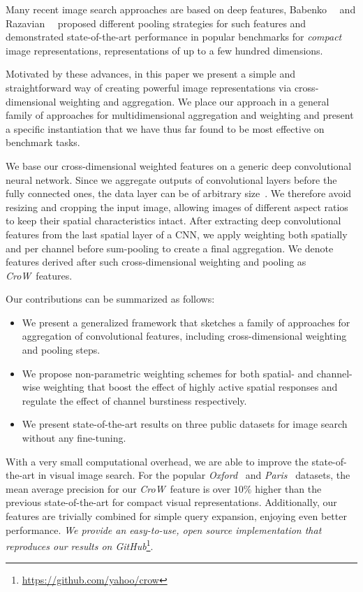 \documentclass[runningheads]{llncs}
\newcommand{\CroW}{\textit{CroW}~} \newcommand{\Crow}{\CroW}
\begin{document}
Many recent image search approaches are based on deep features, \eg Babenko~\etal~\cite{BSCL14,BaLe15} and Razavian~\etal~\cite{RASC14,ARS+14} proposed different pooling strategies for such features and demonstrated state-of-the-art performance in popular benchmarks for \textit{compact} image representations, \ie representations of up to a few hundred dimensions.

Motivated by these advances, in this paper we present a simple and straightforward way of creating powerful image representations via cross-dimensional weighting and aggregation. We place our approach in a general family of approaches for multidimensional aggregation and weighting and present a specific instantiation that we have thus far found to be most effective on benchmark tasks.


We base our cross-dimensional weighted features on a generic deep convolutional neural network. Since we aggregate outputs of convolutional layers before the fully connected ones, the data layer can be of arbitrary size~\cite{LoSD14}. We therefore avoid resizing and cropping the input image, allowing images of different aspect ratios to keep their spatial characteristics intact. After extracting deep convolutional features from the last spatial layer of a CNN, we apply weighting both spatially and per channel before sum-pooling to create a final aggregation. We denote features derived after such cross-dimensional weighting and pooling as \CroW features.



Our contributions can be summarized as follows:
\begin{itemize}
\setlength\itemsep{.01em}
\item We present a generalized framework that sketches a family of approaches for aggregation of convolutional features, including cross-dimensional weighting and pooling steps.
\item We propose non-parametric weighting schemes for both spatial- and channel-wise weighting that boost the effect of highly active spatial responses and regulate the effect of channel burstiness respectively. 
\item We present state-of-the-art results on three public datasets for image search without any fine-tuning. 
\end{itemize}

With a very small computational overhead, we are able to improve the state-of-the-art in visual image search.
For the popular \emph{Oxford}~\cite{PCI+07} and \emph{Paris}~\cite{PCS+08} datasets, the mean average precision for our \Crow feature is over $10\%$ higher than the previous state-of-the-art for compact visual representations. Additionally, our features are trivially combined for simple query expansion, enjoying even better performance.
\textit{We provide an easy-to-use, open source implementation that reproduces our results on GitHub}\footnote{\url{https://github.com/yahoo/crow}}.
\end{document}

